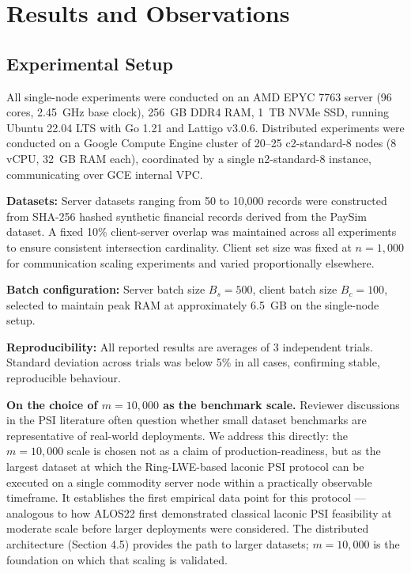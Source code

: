 \chapter{Results and Observations}\label{chap:results}

\section{Experimental Setup}

All single-node experiments were conducted on an AMD EPYC 7763 server (96 cores, 2.45~GHz base clock),
256~GB DDR4 RAM, 1~TB NVMe SSD, running Ubuntu 22.04 LTS with Go 1.21 and Lattigo v3.0.6.
Distributed experiments were conducted on a Google Compute Engine cluster of 20--25 c2-standard-8
nodes (8 vCPU, 32~GB RAM each), coordinated by a single n2-standard-8 instance, communicating over
GCE internal VPC.

\textbf{Datasets:} Server datasets ranging from 50 to 10{,}000 records were constructed from
SHA-256 hashed synthetic financial records derived from the PaySim dataset. A fixed 10\%
client-server overlap was maintained across all experiments to ensure consistent intersection
cardinality. Client set size was fixed at $n = 1{,}000$ for communication scaling experiments
and varied proportionally elsewhere.

\textbf{Batch configuration:} Server batch size $B_s = 500$, client batch size $B_c = 100$,
selected to maintain peak RAM at approximately 6.5~GB on the single-node setup.

\textbf{Reproducibility:} All reported results are averages of 3 independent trials. Standard
deviation across trials was below 5\% in all cases, confirming stable, reproducible behaviour.

\textbf{On the choice of $m = 10{,}000$ as the benchmark scale.} Reviewer discussions in the
PSI literature often question whether small dataset benchmarks are representative of real-world
deployments. We address this directly: the $m = 10{,}000$ scale is chosen not as a claim of
production-readiness, but as the largest dataset at which the Ring-LWE-based laconic PSI
protocol can be executed on a single commodity server node within a practically observable
timeframe. It establishes the first empirical data point for this protocol --- analogous to
how ALOS22 first demonstrated classical laconic PSI feasibility at moderate scale before
larger deployments were considered. The distributed architecture (Section 4.5) provides
the path to larger datasets; $m = 10{,}000$ is the foundation on which that scaling is validated.

